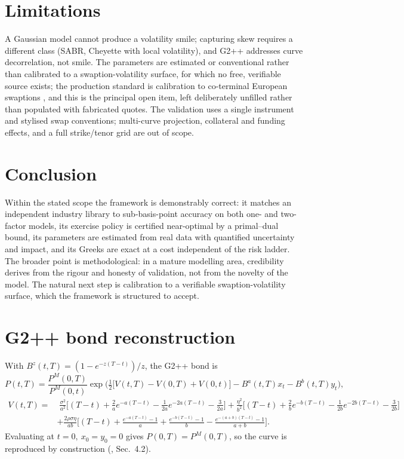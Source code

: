 \documentclass[11pt]{article}
\theoremstyle{plain}
\theoremstyle{definition}
\begin{document}
\section{Limitations}
\label{sec:lims}
A Gaussian model cannot produce a volatility smile; capturing skew requires a different class
(SABR, Cheyette with local volatility), and G2++ addresses curve decorrelation, not smile. The
parameters are estimated or conventional rather than calibrated to a swaption-volatility surface,
for which no free, verifiable source exists; the production standard is calibration to
co-terminal European swaptions \cite{Andersen2000}, and this is the principal open item, left
deliberately unfilled rather than populated with fabricated quotes. The validation uses a single
instrument and stylised swap conventions; multi-curve projection, collateral and funding effects,
and a full strike/tenor grid are out of scope.

\section{Conclusion}
Within the stated scope the framework is demonstrably correct: it matches an independent industry
library to sub-basis-point accuracy on both one- and two-factor models, its exercise policy is
certified near-optimal by a primal--dual bound, its parameters are estimated from real data with
quantified uncertainty and impact, and its Greeks are exact at a cost independent of the risk
ladder. The broader point is methodological: in a mature modelling area, credibility derives from
the rigour and honesty of validation, not from the novelty of the model. The natural next step is
calibration to a verifiable swaption-volatility surface, which the framework is structured to
accept.

\appendix
\section{G2++ bond reconstruction}
\label{app:g2}
With $B^z(t,T)=(1-e^{-z(T-t)})/z$, the G2++ bond is
\[
P(t,T)=\frac{P^M(0,T)}{P^M(0,t)}\exp\!\Big(\tfrac12\big[V(t,T)-V(0,T)+V(0,t)\big]-B^a(t,T)x_t-B^b(t,T)y_t\Big),
\]
\[
\begin{aligned}
V(t,T)=&\;\frac{\sigma^2}{a^2}\Big[(T-t)+\tfrac{2}{a}e^{-a(T-t)}-\tfrac{1}{2a}e^{-2a(T-t)}-\tfrac{3}{2a}\Big]
+\frac{\eta^2}{b^2}\Big[(T-t)+\tfrac{2}{b}e^{-b(T-t)}-\tfrac{1}{2b}e^{-2b(T-t)}-\tfrac{3}{2b}\Big]\\
&+\frac{2\rho\sigma\eta}{ab}\Big[(T-t)+\tfrac{e^{-a(T-t)}-1}{a}+\tfrac{e^{-b(T-t)}-1}{b}-\tfrac{e^{-(a+b)(T-t)}-1}{a+b}\Big].
\end{aligned}
\]
Evaluating at $t=0,\ x_0=y_0=0$ gives $P(0,T)=P^M(0,T)$, so the curve is reproduced by
construction (\cite{BrigoMercurio2006}, Sec.~4.2).
\end{document}
